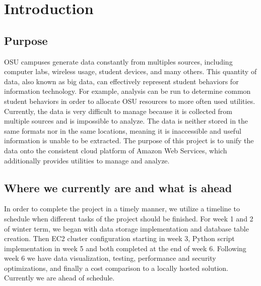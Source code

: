 \section{Introduction}
	\subsection{Purpose}
    OSU campuses generate data constantly from multiples sources, including computer labs, wireless usage, student devices, and many others. This quantity of data, also known as big data, can effectively represent student behaviors for information technology. For example, analysis can be run to determine common student behaviors in order to allocate OSU resources to more often used utilities. Currently, the data is very difficult to manage because it is collected from multiple sources and is impossible to analyze. The data is neither stored in the same formats nor in the same locations, meaning it is inaccessible and useful information is unable to be extracted. The purpose of this project is to unify the data onto the consistent cloud platform of Amazon Web Services, which additionally provides utilities to manage and analyze.
    \subsection{Where we currently are and what is ahead}
    In order to complete the project in a timely manner, we utilize a timeline to schedule when different tasks of the project should be finished. For week 1 and 2 of winter term, we began with data storage implementation and database table creation. Then EC2 cluster configuration starting in week 3, Python script implementation in week 5 and both completed at the end of week 6. Following week 6 we have data visualization, testing, performance and security optimizations, and finally a cost comparison to a locally hosted solution. Currently we are ahead of schedule.